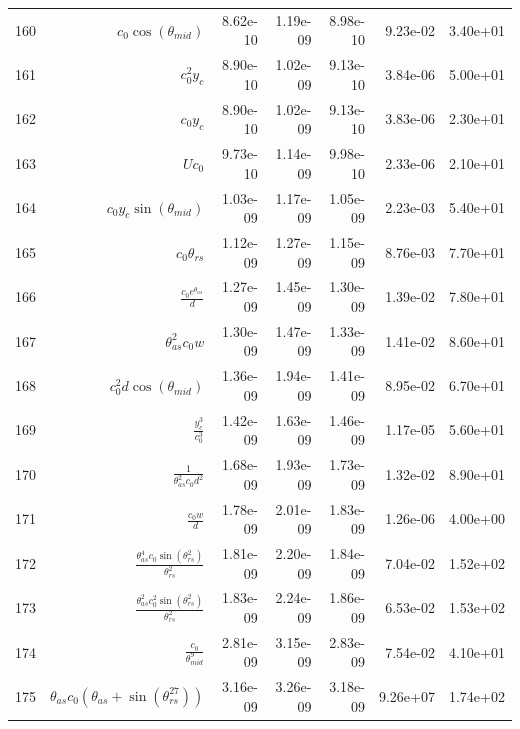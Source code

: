 \begin{tabularx}{\textwidth}{lRRRRRl}
160  &  $ c_{0} \cos{\left(\theta_{mid} \right)} $  &  8.62e-10  &  1.19e-09  &  8.98e-10  &  9.23e-02  &  3.40e+01  \\ 
161  &  $ c_{0}^{2} y_c $  &  8.90e-10  &  1.02e-09  &  9.13e-10  &  3.84e-06  &  5.00e+01  \\ 
162  &  $ c_{0} y_c $  &  8.90e-10  &  1.02e-09  &  9.13e-10  &  3.83e-06  &  2.30e+01  \\ 
163  &  $ U c_{0} $  &  9.73e-10  &  1.14e-09  &  9.98e-10  &  2.33e-06  &  2.10e+01  \\ 
164  &  $ c_{0} y_c \sin{\left(\theta_{mid} \right)} $  &  1.03e-09  &  1.17e-09  &  1.05e-09  &  2.23e-03  &  5.40e+01  \\ 
165  &  $ c_{0} \theta_{rs} $  &  1.12e-09  &  1.27e-09  &  1.15e-09  &  8.76e-03  &  7.70e+01  \\ 
166  &  $ \displaystyle\frac{c_{0} e^{\theta_{as}}}{d} $  &  1.27e-09  &  1.45e-09  &  1.30e-09  &  1.39e-02  &  7.80e+01  \\ 
167  &  $ \theta_{as}^{2} c_{0} w $  &  1.30e-09  &  1.47e-09  &  1.33e-09  &  1.41e-02  &  8.60e+01  \\ 
168  &  $ c_{0}^{2} d \cos{\left(\theta_{mid} \right)} $  &  1.36e-09  &  1.94e-09  &  1.41e-09  &  8.95e-02  &  6.70e+01  \\ 
169  &  $ \displaystyle\frac{y_c^{3}}{c_{0}^{3}} $  &  1.42e-09  &  1.63e-09  &  1.46e-09  &  1.17e-05  &  5.60e+01  \\ 
170  &  $ \displaystyle\frac{1}{\theta_{as}^{2} c_{0} d^{2}} $  &  1.68e-09  &  1.93e-09  &  1.73e-09  &  1.32e-02  &  8.90e+01  \\ 
171  &  $ \displaystyle\frac{c_{0} w}{d} $  &  1.78e-09  &  2.01e-09  &  1.83e-09  &  1.26e-06  &  4.00e+00  \\ 
172  &  $ \displaystyle\frac{\theta_{as}^{4} c_{0} \sin{\left(\theta_{rs}^{2} \right)}}{\theta_{rs}^{2}} $  &  1.81e-09  &  2.20e-09  &  1.84e-09  &  7.04e-02  &  1.52e+02  \\ 
173  &  $ \displaystyle\frac{\theta_{as}^{2} c_{0}^{2} \sin{\left(\theta_{rs}^{2} \right)}}{\theta_{rs}^{2}} $  &  1.83e-09  &  2.24e-09  &  1.86e-09  &  6.53e-02  &  1.53e+02  \\ 
174  &  $ \displaystyle\frac{c_{0}}{\theta_{mid}^{9}} $  &  2.81e-09  &  3.15e-09  &  2.83e-09  &  7.54e-02  &  4.10e+01  \\ 
175  &  $ \theta_{as} c_{0} \left(\theta_{as} + \sin{\left(\theta_{rs}^{27} \right)}\right) $  &  3.16e-09  &  3.26e-09  &  3.18e-09  &  9.26e+07  &  1.74e+02  \\ 

\end{tabularx}
